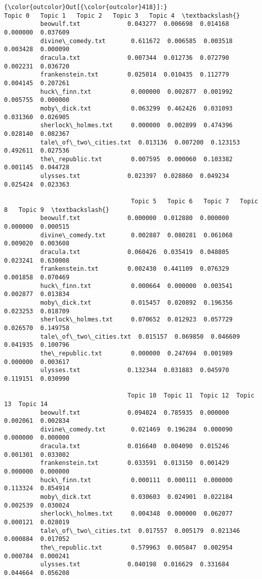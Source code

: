 \documentclass{article}
\begin{document}
            \begin{Verbatim}[commandchars=\\\{\}]
{\color{outcolor}Out[{\color{outcolor}418}]:}                          Topic 0   Topic 1   Topic 2   Topic 3   Topic 4  \textbackslash{}
          beowulf.txt             0.043277  0.006698  0.014168  0.000000  0.037609   
          divine\_comedy.txt       0.611672  0.006585  0.003518  0.003428  0.000090   
          dracula.txt             0.007344  0.012736  0.072790  0.002231  0.036720   
          frankenstein.txt        0.025014  0.010435  0.112779  0.004145  0.207261   
          huck\_finn.txt           0.000000  0.002877  0.001992  0.005755  0.000000   
          moby\_dick.txt           0.063299  0.462426  0.031093  0.031360  0.026905   
          sherlock\_holmes.txt     0.000000  0.002899  0.474396  0.028140  0.082367   
          tale\_of\_two\_cities.txt  0.013136  0.007200  0.123153  0.492611  0.027536   
          the\_republic.txt        0.007595  0.000060  0.103382  0.001145  0.044728   
          ulysses.txt             0.023397  0.028860  0.049234  0.025424  0.023363   
          
                                   Topic 5   Topic 6   Topic 7   Topic 8   Topic 9  \textbackslash{}
          beowulf.txt             0.000000  0.012880  0.000000  0.000000  0.000515   
          divine\_comedy.txt       0.002887  0.080281  0.061068  0.009020  0.003608   
          dracula.txt             0.060426  0.035419  0.048805  0.023241  0.630008   
          frankenstein.txt        0.002430  0.441109  0.076329  0.001858  0.070469   
          huck\_finn.txt           0.000664  0.000000  0.003541  0.002877  0.013834   
          moby\_dick.txt           0.015457  0.020892  0.196356  0.023253  0.018709   
          sherlock\_holmes.txt     0.070652  0.012923  0.057729  0.026570  0.149758   
          tale\_of\_two\_cities.txt  0.015157  0.069850  0.046609  0.041935  0.100796   
          the\_republic.txt        0.000000  0.247694  0.001989  0.000000  0.003617   
          ulysses.txt             0.132344  0.031883  0.045970  0.119151  0.030990   
          
                                  Topic 10  Topic 11  Topic 12  Topic 13  Topic 14  
          beowulf.txt             0.094024  0.785935  0.000000  0.002061  0.002834  
          divine\_comedy.txt       0.021469  0.196284  0.000090  0.000000  0.000000  
          dracula.txt             0.016640  0.004090  0.015246  0.001301  0.033002  
          frankenstein.txt        0.033591  0.013150  0.001429  0.000000  0.000000  
          huck\_finn.txt           0.000111  0.000111  0.000000  0.113324  0.854914  
          moby\_dick.txt           0.030603  0.024901  0.022184  0.002539  0.030024  
          sherlock\_holmes.txt     0.004348  0.000000  0.062077  0.000121  0.028019  
          tale\_of\_two\_cities.txt  0.017557  0.005179  0.021346  0.000884  0.017052  
          the\_republic.txt        0.579963  0.005847  0.002954  0.000784  0.000241  
          ulysses.txt             0.040198  0.016629  0.331684  0.044664  0.056208  
\end{Verbatim}
        
\end{document}
